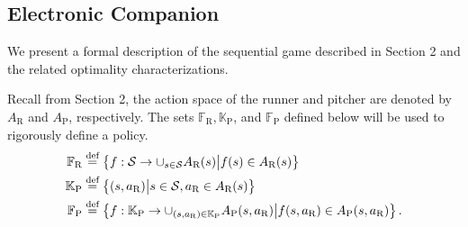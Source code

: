 \documentclass[opre,dblanonrev]{informs4}
\newcommand{\defeq}{\stackrel{\text{def}}{=}}
\begin{document}
  \maketitle

  \newpage

  
  \begin{APPENDICES}


\setcounter{page}{1}

\setcounter{lemma}{0}
\setcounter{theorem}{0}
\setcounter{proposition}{0}

\setcounter{figure}{0}
\setcounter{table}{0}

\renewcommand{\thefigure}{A.\arabic{figure}}
\renewcommand{\thetable}{A.\arabic{table}}
\renewcommand{\theequation}{EC.\arabic{equation}}

\section*{Electronic Companion}
    We present a formal description of the sequential game described in Section 2 and the related optimality characterizations. 
    
    Recall from Section 2, the action space of the runner and pitcher are denoted by $A_{\text{R}}$ and $A_\text{P}$, respectively. The sets $\mathbb{F}_\text{R}, \mathbb{K}_\text{P}$, and $\mathbb{F}_\text{P}$ defined below will be used to rigorously define a policy. 
        \begingroup
        \allowdisplaybreaks
        \begin{align*}
            \mathbb{F}_\text{R} &\defeq \left\{f: {\cal S} \to \cup_{s \in {\cal S}}A_{\text{R}}(s) \big| f(s) \in A_{\text{R}}(s)\right\}\\
            \mathbb{K}_\text{P} &\defeq \left\{(s,a_\text{R})\big| s \in {\cal S}, a_\text{R} \in A_\text{R}(s)\right\}\\
            \mathbb{F}_\text{P} &\defeq \left\{f: \mathbb{K}_\text{P} \to \cup_{(s,a_\text{R}) \in \mathbb{K}_\text{P}} A_\text{P}(s,a_\text{R}) \big| f(s,a_\text{R}) \in A_\text{P}(s,a_\text{R})\right\}.
        \end{align*}
        \endgroup
    

\end{APPENDICES}
\end{document}
